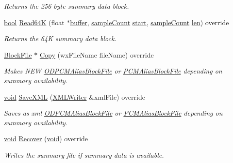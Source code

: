 \begin{DoxyCompactItemize}
\begin{DoxyCompactList}\small\item\em Returns the 256 byte summary data block. \end{DoxyCompactList}\item 
\hyperlink{mac_2config_2i386_2lib-src_2libsoxr_2soxr-config_8h_abb452686968e48b67397da5f97445f5b}{bool} \hyperlink{class_o_d_p_c_m_alias_block_file_a50e25f64944b108d82c7d1a14901571f}{Read64K} (float $\ast$\hyperlink{structbuffer}{buffer}, \hyperlink{include_2audacity_2_types_8h_afa427e1f521ea5ec12d054e8bd4d0f71}{sample\+Count} \hyperlink{seqread_8c_ac503262ae470564980711da4f78b1181}{start}, \hyperlink{include_2audacity_2_types_8h_afa427e1f521ea5ec12d054e8bd4d0f71}{sample\+Count} \hyperlink{lib_2expat_8h_af86d325fecfc8f47b61fbf5a5146f582}{len}) override
\begin{DoxyCompactList}\small\item\em Returns the 64K summary data block. \end{DoxyCompactList}\item 
\hyperlink{class_block_file}{Block\+File} $\ast$ \hyperlink{class_o_d_p_c_m_alias_block_file_ad438dbf015da43581f8b5d218cc83ff2}{Copy} (wx\+File\+Name file\+Name) override
\begin{DoxyCompactList}\small\item\em Makes N\+EW \hyperlink{class_o_d_p_c_m_alias_block_file}{O\+D\+P\+C\+M\+Alias\+Block\+File} or \hyperlink{class_p_c_m_alias_block_file}{P\+C\+M\+Alias\+Block\+File} depending on summary availability. \end{DoxyCompactList}\item 
\hyperlink{sound_8c_ae35f5844602719cf66324f4de2a658b3}{void} \hyperlink{class_o_d_p_c_m_alias_block_file_a2693e00c383ef58a4febd44eafaf2c6a}{Save\+X\+ML} (\hyperlink{class_x_m_l_writer}{X\+M\+L\+Writer} \&xml\+File) override
\begin{DoxyCompactList}\small\item\em Saves as xml \hyperlink{class_o_d_p_c_m_alias_block_file}{O\+D\+P\+C\+M\+Alias\+Block\+File} or \hyperlink{class_p_c_m_alias_block_file}{P\+C\+M\+Alias\+Block\+File} depending on summary availability. \end{DoxyCompactList}\item 
\hyperlink{sound_8c_ae35f5844602719cf66324f4de2a658b3}{void} \hyperlink{class_o_d_p_c_m_alias_block_file_a645b0cb82890afcd09f20c5b110c1b10}{Recover} (\hyperlink{sound_8c_ae35f5844602719cf66324f4de2a658b3}{void}) override
\begin{DoxyCompactList}\small\item\em Writes the summary file if summary data is available. \end{DoxyCompactList}\item 

\end{DoxyCompactItemize}
